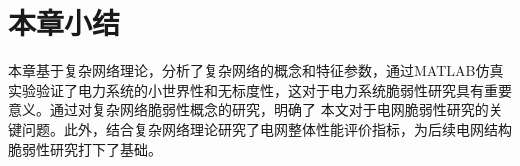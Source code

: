 




\section{本章小结}
\label{sec:sum2}
本章基于复杂网络理论，分析了复杂网络的概念和特征参数，通过MATLAB仿真实验验证了电力系统的小世界性和无标度性，这对于电力系统脆弱性研究具有重要意义。通过对复杂网络脆弱性概念的研究，明确了
本文对于电网脆弱性研究的关键问题。此外，结合复杂网络理论研究了电网整体性能评价指标，为后续电网结构脆弱性研究打下了基础。




